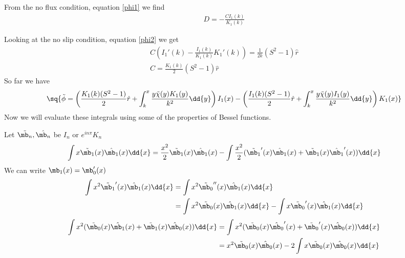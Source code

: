 \documentclass[12pt]{article}
\begin{document}
From the no flux condition, equation \eqref{phi1} we find 
\begin{align}
D=-\frac{CI_1(k)}{K_1(k)}
\end{align}

Looking at the no slip condition, equation \eqref{phi2} we get
\begin{align}
C\left(I_1'(k)-\frac{I_1(k)}{K_1(k)}K_1'(k)\right)=\frac{1}{2k}(S^2-1)\hat r\\
C=\frac{K_1(k)}{2}(S^2-1)\hat r
\end{align}
So far we have
\footnotesize
\begin{align}
\sq{\tilde\phi=\left(\frac{K_1(k)(S^2-1)}{2}\hat r+\int_k^x{\frac{y\tilde\chi(y)K_1(y)}{k^2}\dd{y}}\right)I_1(x)-\left(\frac{I_1(k)(S^2-1)}{2}\hat r+\int_k^x{\frac{y\tilde\chi(y)I_1(y)}{k^2}\dd{y}}\right)K_1(x)}
\end{align}
\normalsize
Now we will evaluate these integrals using some of the properties of Bessel functions\cite[Sections 10.28-29]{NIST:DLMF}.

Let $\tilde{\mb_n}, \hat{\mb_n}$ be $I_n$ or $e^{in\pi}K_n$
\begin{align}
\int{x\tilde{\mb_1}(x) \hat{\mb_1}(x)\dd{x}}=\frac{x^2}{2}\tilde{\mb_1}(x) \hat{\mb_1}(x)-\int{\frac{x^2}{2}(\tilde{\mb_1}'(x) \hat{\mb_1}(x)+\tilde{\mb_1}(x) \hat{\mb_1}'(x))\dd{x}}
\end{align}
We can write $\mb_1(x)=\mb_0'(x)$
\begin{align}
\int{x^2\tilde{\mb_1}'(x) \hat{\mb_1}(x)\dd{x}}&=\int{x^2\tilde{\mb_0}''(x) \hat{\mb_1}(x)\dd{x}}\\
&=\int{x^2\tilde{\mb_0}(x) \hat{\mb_1}(x)\dd{x}}-\int{x\tilde{\mb_0}'(x) \hat{\mb_1}(x)\dd{x}}
\end{align}
\begin{align}
\int{x^2(\tilde{\mb_0}(x) \hat{\mb_1}(x)+\tilde{\mb_1}(x) \hat{\mb_0}(x))\dd{x}}&=\int{x^2(\tilde{\mb_0}(x) \hat{\mb_0}'(x)+\tilde{\mb_0}'(x) \hat{\mb_0}(x))\dd{x}}\\
&=x^2\tilde{\mb_0}(x) \hat{\mb_0}(x)-2\int{x\tilde{\mb_0}(x) \hat{\mb_0}(x)\dd{x}}
\end{align}
\end{document}
